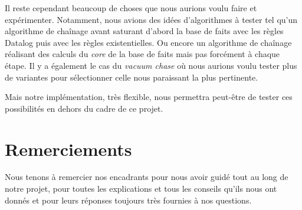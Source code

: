 \par Il reste cependant beaucoup de choses que nous aurions voulu faire et expérimenter. Notamment, nous avions des idées d'algorithmes à tester tel qu'un algorithme de chaînage avant saturant d'abord la base de faits avec les règles Datalog puis avec les règles existentielles. Ou encore un algorithme de chaînage réalisant des calculs du \textit{core} de la base de faits mais pas forcément à chaque étape.
 Il y a également le cas du \textit{vacuum chase} où nous aurions voulu tester plus de variantes pour sélectionner celle nous paraissant la plus pertinente.
\par Mais notre implémentation, très flexible, nous permettra peut-être de tester ces possibilités en dehors du cadre de ce projet.


\section{Remerciements}

Nous tenons à remercier nos encadrants pour nous avoir guidé tout au long de notre projet, pour toutes les explications et tous les conseils qu'ils nous ont donnés et pour leurs réponses toujours très fournies à nos questions.




